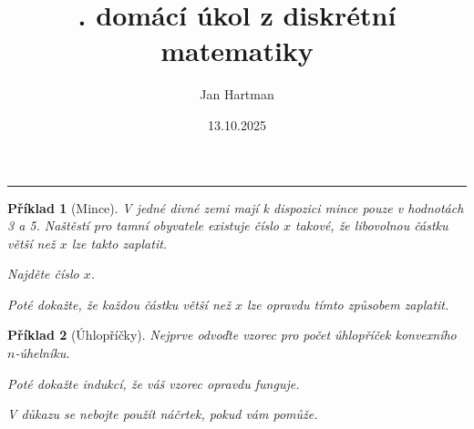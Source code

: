 \documentclass[11pt]{article}
\title{\tutnum. domácí úkol z diskrétní matematiky}
\author{Jan Hartman}
\date{13.10.2025}
\newcommand{\titlerule}{%
    \noindent %
    \makebox[\textwidth]{\large \thetitle \hfill termín: \thedate}
    \rule{\textwidth}{0.4pt}%
}
\theoremstyle{definitionstyle}
\theoremstyle{problemstyle}
\newtheorem{problem}{Příklad}
\begin{document}
\titlerule

\begin{problem}[Mince]
V jedné divné zemi mají k dispozici mince pouze v hodnotách 3 a 5. Naštěstí pro tamní obyvatele existuje číslo $x$ takové, že libovolnou částku větší než $x$ lze takto zaplatit.

\noindent
Najděte číslo $x$.

\noindent
Poté dokažte, že každou částku větší než $x$ lze opravdu tímto způsobem zaplatit.
\end{problem}

\begin{problem}[Úhlopříčky]
Nejprve odvoďte vzorec pro počet úhlopříček konvexního $n$-úhelníku.

\noindent
Poté dokažte indukcí, že váš vzorec opravdu funguje.

\noindent
\textit{V důkazu se nebojte použít náčrtek, pokud vám pomůže.}
\end{problem}
\end{document}
